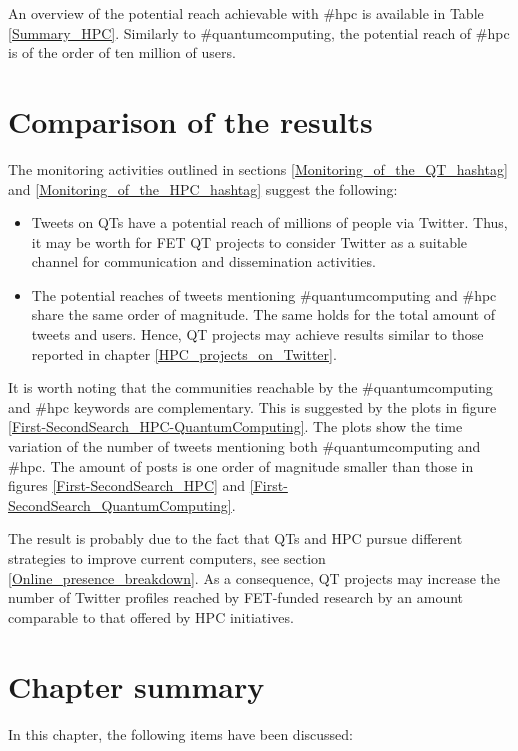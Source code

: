 An overview of the potential reach achievable with \#hpc is available in Table \ref{Summary_HPC}. Similarly to \#quantumcomputing, the potential reach of \#hpc is of the order of ten million of users. 

\section{Comparison of the results} \label{Comparison_of_the_results}
The monitoring activities outlined in sections \ref{Monitoring_of_the_QT_hashtag} and \ref{Monitoring_of_the_HPC_hashtag} suggest the following:

\begin{itemize}
 \item Tweets on QTs have a potential reach of millions of people via Twitter. Thus, it may be worth for FET QT projects to consider Twitter as a suitable channel for communication and dissemination activities.
 \item The potential reaches of tweets mentioning \#quantumcomputing and \#hpc share the same order of magnitude. The same holds for the total amount of tweets and users. Hence, QT projects may achieve results similar to those reported in chapter \ref{HPC_projects_on_Twitter}. 
\end{itemize}

It is worth noting that the communities reachable by the \#quantumcomputing and \#hpc keywords are complementary. This is suggested by the plots in figure \ref{First-SecondSearch_HPC-QuantumComputing}. The plots show the time variation of the number of tweets mentioning both \#quantumcomputing and \#hpc. The amount of posts is one order of magnitude smaller than those in figures \ref{First-SecondSearch_HPC} and \ref{First-SecondSearch_QuantumComputing}. 

The result is probably due to the fact that QTs and HPC pursue different strategies to improve current computers, see section \ref{Online_presence_breakdown}. As a consequence, QT projects may increase the number of Twitter profiles reached by FET-funded research by an amount comparable to that offered by HPC initiatives. 

\section{Chapter summary} 
In this chapter, the following items have been discussed: 

